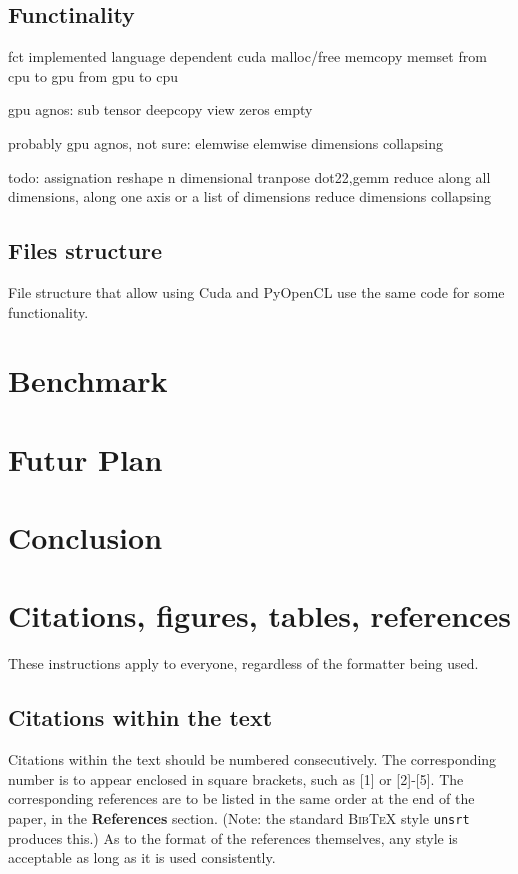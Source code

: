 \documentclass{article} %
\begin{document}
\subsection{Functinality}
fct implemented language dependent
cuda
malloc/free
memcopy
memset
from cpu to gpu
from gpu to cpu

gpu agnos:
sub tensor
deepcopy
view
zeros
empty

probably gpu agnos, not sure:
elemwise
elemwise dimensions collapsing


todo:
assignation
reshape
n dimensional tranpose
dot22,gemm
reduce along all dimensions, along one axis or a list of dimensions
reduce dimensions collapsing

\subsection{Files structure}
File structure that allow using Cuda and PyOpenCL use the same code for some functionality.

\section{Benchmark}
\section{Futur Plan}
\section{Conclusion}

\section{Citations, figures, tables, references}
\label{others}

These instructions apply to everyone, regardless of the formatter being used.

\subsection{Citations within the text}

Citations within the text should be numbered consecutively. The corresponding
number is to appear enclosed in square brackets, such as [1] or [2]-[5]. The
corresponding references are to be listed in the same order at the end of the
paper, in the \textbf{References} section. (Note: the standard
\textsc{Bib\TeX} style \texttt{unsrt} produces this.) As to the format of the
references themselves, any style is acceptable as long as it is used
consistently.
\end{document}
